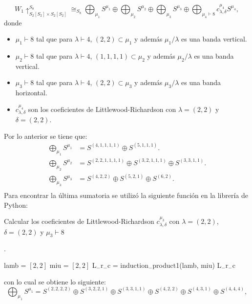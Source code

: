 \documentclass[12pt]{book}
\theoremstyle{definition}
\newcounter{in}
\begin{document}
\begin{equation}
W_{1} \uparrow_{S_{2} \left [ S_{2} \right ] \times S_{2} \left [ S_{2} \right ]}^{S_{8}} \cong_{S_{8}} \bigoplus_{\mu_{1}} S^{\mu_{1}} \oplus \bigoplus_{\mu_{2}} S^{\mu_{2}} \oplus \bigoplus_{\mu_{3}} S^{\mu_{3}} \oplus \bigoplus_{\mu_{4} \vdash 8} c_{\lambda,\delta}^{\mu_{4}}S^{\mu_{4}},
\end{equation}
donde 
\begin{itemize}
\item $\mu_{1} \vdash 8$ tal que para $\lambda \vdash 4$, $(2,2) \subset \mu_{1}$ y además $\mu_{1} / \lambda$ es una banda vertical. 
\item $\mu_{2} \vdash 8$ tal que para $\lambda \vdash 4$, $(1,1,1,1) \subset \mu_{2}$ y además $\mu_{2} / \lambda$ es una banda vertical.
\item $\mu_{3} \vdash 8$ tal que para $\lambda \vdash 4$, $(2,2) \subset \mu_{3}$ y además $\mu_{3} / \lambda$ es una banda horizontal.
\item $c_{\lambda,\delta}^{\mu_{4}}$ son los coeficientes de Littlewood-Richardson con $\lambda = (2,2)$ y $\delta = (2,2)$.
\end{itemize}
Por lo anterior se tiene que:
\begin{equation}
\begin{aligned}
\bigoplus_{\mu_{1}} S^{\mu_{1}} & = S^{(4, 1, 1, 1, 1)} \oplus S^{(5, 1, 1, 1)}. \\
\bigoplus_{\mu_{2}} S^{\mu_{2}} & = S^{(2, 2, 1, 1, 1, 1)} \oplus S^{(3, 2, 1, 1, 1)} \oplus S^{(3, 3, 1, 1)}. \\
\bigoplus_{\mu_{3}} S^{\mu_{3}} & = S^{(4, 2, 2)} \oplus S^{(5, 2, 1)} \oplus S^{(6, 2)}. \\
\end{aligned}
\end{equation}
Para encontrar la última sumatoria se utilizó la siguiente función en la librería de Python:
\begin{algorithm}[H]
\caption{Calcular los coeficientes de Littlewood-Richardson $c_{\lambda,\delta}^{\mu_{3}}$ con $\lambda = (2,2)$, $\delta = (2,2)$ y $\mu_{3} \vdash 8$}.
\begin{algorithmic}
\STATE lamb = $\left [ 2, 2 \right ]$
\STATE miu = $\left [ 2, 2 \right ]$
\STATE L$_{-}$r$_{-}$c = induction$_{-}$product1(lamb, miu)
\PRINT L$_{-}$r$_{-}$c
\end{algorithmic}
\end{algorithm}
con lo cual se obtiene lo siguiente:
\begin{equation}
\bigoplus_{\mu_{1}} S^{\mu_{1}}  = S^{(2, 2, 2, 2)} \oplus S^{(3, 2, 2, 1)} \oplus S^{(3, 3, 1, 1)} \oplus S^{(4, 2, 2)} \oplus S^{(4, 3, 1)} \oplus S^{(4, 4, 4)},
\end{equation}
\end{document}
